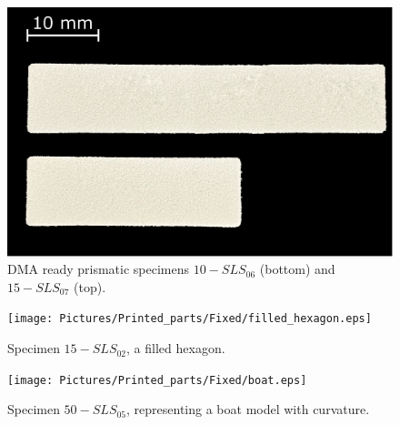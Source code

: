 \documentclass{article}
\begin{document}
        \begin{figure}[h!]
            \centering
            \includegraphics[width=\textwidth]{Pictures/Printed_parts/Fixed/DMA_samples.eps}
            \caption{DMA ready prismatic specimens $10-SLS_{06}$ (bottom) and $15-SLS_{07}$ (top).}
            \label{fig:printed_specimens_DMA}
        \end{figure}

        \begin{figure}[h!]
            \centering
            \texttt{[image: Pictures/Printed\_parts/Fixed/filled\_hexagon.eps]}
            \caption{Specimen $15-SLS_{02}$, a filled hexagon.}
            \label{fig:printed_specimens_filledhexagon}
        \end{figure}

        \begin{figure}[h!]
            \centering
            \texttt{[image: Pictures/Printed\_parts/Fixed/boat.eps]}
            \caption{Specimen $50-SLS_{05}$, representing a boat model with curvature.}
            \label{fig:printed_specimens_boat}
        \end{figure}
\end{document}
